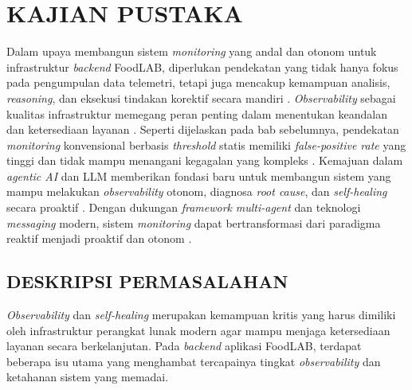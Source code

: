 \chapter{KAJIAN PUSTAKA}

Dalam upaya membangun sistem \textit{monitoring} yang andal dan otonom untuk infrastruktur \textit{backend} FoodLAB, diperlukan pendekatan yang tidak hanya fokus pada pengumpulan data telemetri, tetapi juga mencakup kemampuan analisis, \textit{reasoning}, dan eksekusi tindakan korektif secara mandiri \cite{trinity2023}. \textit{Observability} sebagai kualitas infrastruktur memegang peran penting dalam menentukan keandalan dan ketersediaan layanan \cite{trinity2023}. Seperti dijelaskan pada bab sebelumnya, pendekatan \textit{monitoring} konvensional berbasis \textit{threshold} statis memiliki \textit{false-positive rate} yang tinggi dan tidak mampu menangani kegagalan yang kompleks \cite{hrusto2025monitoring, voutsas2024mitigating}. Kemajuan dalam \textit{agentic AI} dan LLM memberikan fondasi baru untuk membangun sistem yang mampu melakukan \textit{observability} otonom, diagnosa \textit{root cause}, dan \textit{self-healing} secara proaktif \cite{xu2025large, dinh2025enhancing}. Dengan dukungan \textit{framework} \textit{multi-agent} dan teknologi \textit{messaging} modern, sistem \textit{monitoring} dapat bertransformasi dari paradigma reaktif menjadi proaktif dan otonom \cite{zou2022docker, fu2025leveraging}.

\section{DESKRIPSI PERMASALAHAN}

\textit{Observability} dan \textit{self-healing} merupakan kemampuan kritis yang harus dimiliki oleh infrastruktur perangkat lunak modern agar mampu menjaga ketersediaan layanan secara berkelanjutan. Pada \textit{backend} aplikasi FoodLAB, terdapat beberapa isu utama yang menghambat tercapainya tingkat \textit{observability} dan ketahanan sistem yang memadai.

